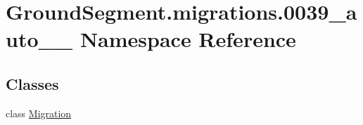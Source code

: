 \hypertarget{namespace_ground_segment_1_1migrations_1_10039__auto__20170131__2008}{}\section{Ground\+Segment.\+migrations.0039\+\_\+auto\+\_\+\_ Namespace Reference}
\label{namespace_ground_segment_1_1migrations_1_10039__auto__20170131__2008}
\subsection*{Classes}
\begin{DoxyCompactItemize}
\item 
class \hyperlink{class_ground_segment_1_1migrations_1_10039__auto__20170131__2008_1_1_migration}{Migration}
\end{DoxyCompactItemize}
